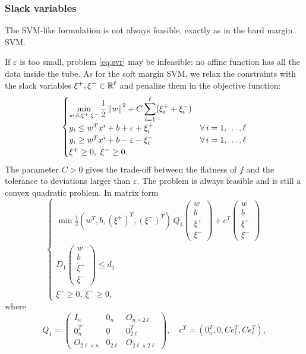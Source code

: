 \subsubsection{Slack variables}

The SVM-like formulation is not always feasible, exactly as in the hard margin SVM.

If $\varepsilon$ is too small, problem \eqref{eq:svr} may be infeasible: no affine function has all the data inside the tube. As for the soft margin SVM, we relax the constraints with the slack variables $\xi^+,\xi^- \in \mathbb{R}^\ell$ and penalize them in the objective function:
\begin{equation}\label{eq:svr-slack}
\begin{cases}
\displaystyle \min_{w,b,\xi^+,\xi^-} \frac{1}{2}\left\lVert w \right\rVert^2 + C\sum_{i=1}^{\ell}(\xi_i^+ + \xi_i^-)\\[1ex]
y_i \le w^Tx^i + b + \varepsilon + \xi_i^+ & \forall\, i=1,\dots,\ell\\
y_i \ge w^Tx^i + b - \varepsilon - \xi_i^- & \forall\, i=1,\dots,\ell\\
\xi^+ \ge 0,\ \xi^- \ge 0.
\end{cases}
\end{equation}
The parameter $C>0$ gives the trade-off between the flatness of $f$ and the tolerance to deviations larger than $\varepsilon$. The problem is always feasible and is still a convex quadratic problem. In matrix form
\[
\begin{cases}
\displaystyle \min \frac{1}{2}(w^T, b, (\xi^+)^T, (\xi^-)^T)\,Q_1 \begin{pmatrix} w\\ b\\ \xi^+\\ \xi^- \end{pmatrix} + c^T\begin{pmatrix} w\\ b\\ \xi^+\\ \xi^- \end{pmatrix}\\[1ex]
D_1\begin{pmatrix} w\\ b\\ \xi^+\\ \xi^- \end{pmatrix} \le d_1\\
\xi^+\ge 0,\ \xi^-\ge 0,
\end{cases}
\]
where
\[
Q_1 = \begin{pmatrix} I_n & 0_n & O_{n\times 2\ell}\\ 0_n^T & 0 & 0_{2\ell}^T\\ O_{2\ell\times n} & 0_{2\ell} & O_{2\ell\times 2\ell} \end{pmatrix},\quad
c^T = (0_n^T, 0, C e_\ell^T, C e_\ell^T),
\]
